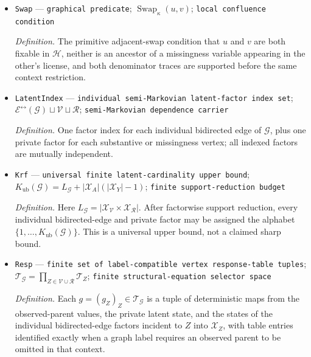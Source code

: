 \documentclass{article}
\begin{document}
\begin{itemize}
  \par\smallskip\noindent\emph{Definition.} The update that restricts a trace-aware state to missingness context \(c\) only after recording every kernel factor derived before restriction.
  \item \texttt{Swap} --- \texttt{graphical predicate}; \(\operatorname{Swap}_{\kappa}(u,v)\); \texttt{local confluence condition}
  \par\smallskip\noindent\emph{Definition.} The primitive adjacent-swap condition that \(u\) and \(v\) are both fixable in \(\mathcal H\), neither is an ancestor of a missingness variable appearing in the other's license, and both denominator traces are supported before the same context restriction.
  \item \texttt{LatentIndex} --- \texttt{individual semi-\allowbreak{}Markovian latent-\allowbreak{}factor index set}; \(\mathcal E^{\leftrightarrow}(\mathcal G)\sqcup\mathcal V\sqcup\mathcal R\); \texttt{semi-\allowbreak{}Markovian dependence carrier}
  \par\smallskip\noindent\emph{Definition.} One factor index for each individual bidirected edge of \(\mathcal G\), plus one private factor for each substantive or missingness vertex; all indexed factors are mutually independent.
  \item \texttt{Krf} --- \texttt{universal finite latent-\allowbreak{}cardinality upper bound}; \(K_{\mathrm{ub}}(\mathcal G)=L_{\mathcal G}+|\mathcal X_A|(|\mathcal X_Y|-1)\); \texttt{finite support-\allowbreak{}reduction budget}
  \par\smallskip\noindent\emph{Definition.} Here \(L_{\mathcal G}=|\mathcal X_{\mathcal V}\times\mathcal X_{\mathcal R}|\). After factorwise support reduction, every individual bidirected-edge and private factor may be assigned the alphabet \(\{1,\ldots,K_{\mathrm{ub}}(\mathcal G)\}\). This is a universal upper bound, not a claimed sharp bound.
  \item \texttt{Resp} --- \texttt{finite set of label-\allowbreak{}compatible vertex response-\allowbreak{}table tuples}; \(\mathcal T_{\mathcal G}=\prod_{Z\in\mathcal V\cup\mathcal R}\mathcal T_Z\); \texttt{finite structural-\allowbreak{}equation selector space}
  \par\smallskip\noindent\emph{Definition.} Each \(g=(g_Z)_Z\in\mathcal T_{\mathcal G}\) is a tuple of deterministic maps from the observed-parent values, the private latent state, and the states of the individual bidirected-edge factors incident to \(Z\) into \(\mathcal X_Z\), with table entries identified exactly when a graph label requires an observed parent to be omitted in that context.

\end{itemize}
\end{document}
